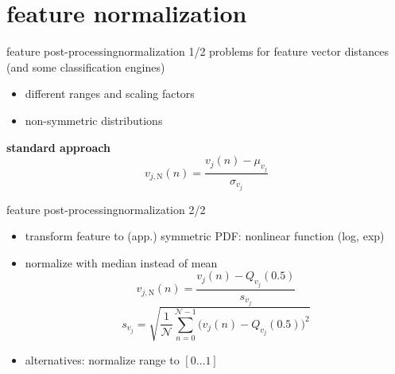     \section[normalization]{feature normalization}
		\begin{frame}{feature post-processing}{normalization 1/2}
			problems for feature vector distances (and some classification engines)
			\begin{itemize}
				\item	different ranges and scaling factors
				\item	non-symmetric distributions
			\end{itemize}
			\pause
            \bigskip
			\textbf{standard approach}
				\begin{equation*}\label{eq:featnorm_standard}
					v_{j,\mathrm{N}}(n) = \frac{v_j(n) - \mu_{v_j}}{\sigma_{v_j}}
				\end{equation*}
		\end{frame}
		\begin{frame}{feature post-processing}{normalization 2/2}
			\begin{itemize}
				\item	transform feature to (app.) symmetric PDF: nonlinear function (log, exp)
				\smallskip
                \item<2->	normalize with median instead of mean
                    \begin{equation}\label{eq:featnorm_median}
                        v_{j,\mathrm{N}}(n) = \frac{v_j(n) - Q_{v_j}(0.5)}{s_{v_j}}
                    \end{equation}
                    \begin{equation}
                        s_{v_j} = \sqrt{\frac{1}{\mathcal{N}}\sum\limits_{n=0}^{\mathcal{N}-1}{\big(v_j(n)-Q_{v_j}(0.5)\big)^2}}
                    \end{equation}
                \smallskip
                \item<3->   alternatives: normalize range to $[0\ldots 1]$
            \end{itemize}
             
		\end{frame}

